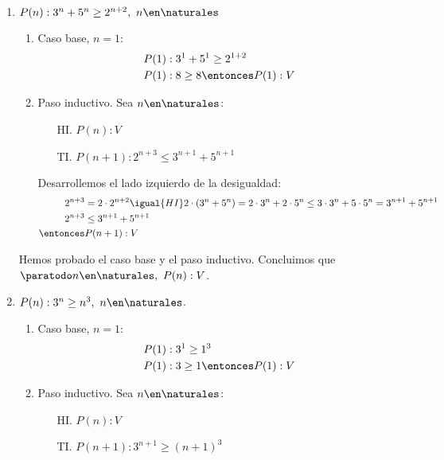\begin{enumerate}[label=\roman*)]
  \item $P(n): 3^n + 5^n \geq 2^{n+2},\ n \en \naturales$
        \begin{enumerate}[label=\arabic*)]
          \item Caso base, $n = 1$:
                \begin{align*}
                  P(1) & : 3^1 + 5^1 \geq 2^{1+2}     \\
                  P(1) & : 8 \geq 8 \entonces P(1): V
                \end{align*}
          \item Paso inductivo. Sea $n \en \naturales$:
                \begin{enumerate}
                  \item[HI.] $P(n): V$
                  \item[TI.] $P(n+1): 2^{n+3} \leq 3^{n+1} + 5^{n+1}$
                \end{enumerate}

                Desarrollemos el lado izquierdo de la desigualdad:
                \begin{align*}
                  2^{n+3}   & = 2 \cdot 2^{n+2} \igual{HI} 2 \cdot (3^n + 5^n) = 2 \cdot 3^n + 2 \cdot 5^n \leq
                  3 \cdot 3^n + 5 \cdot 5^n = 3^{n+1} + 5^{n+1}                                                 \\
                  2^{n+3}   & \leq 3^{n+1} + 5^{n+1}                                                            \\
                  \entonces & P(n+1): V
                \end{align*}
        \end{enumerate}

        Hemos probado el caso base y el paso inductivo. Concluimos que $\paratodo n \en \naturales, \ P(n): V$.

  \item $P(n): 3^n \geq n^3, \ n \en \naturales$.
        \begin{enumerate}[label=\arabic*)]
          \item Caso base, $n = 1$:
                \begin{align*}
                  P(1) & : 3^1 \geq 1^3               \\
                  P(1) & : 3 \geq 1 \entonces P(1): V
                \end{align*}
          \item Paso inductivo. Sea $n \en \naturales$:
                \begin{enumerate}
                  \item[HI.] $P(n): V$
                  \item[TI.] $P(n+1): 3^{n+1} \geq (n+1)^3$
                \end{enumerate}


\end{enumerate}
\end{enumerate}
